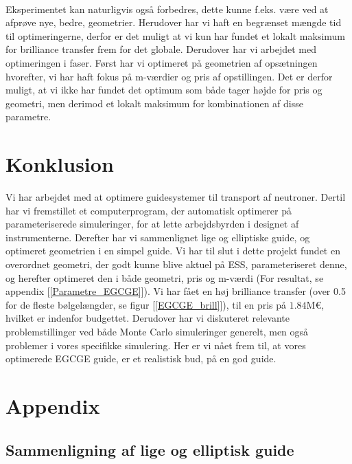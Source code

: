 \documentclass[12pt,oneside,a4paper]{article}
\begin{document}
{{{{{\\
Eksperimentet kan naturligvis også forbedres, dette kunne f.eks. være ved at afprøve nye, bedre, geometrier. Herudover har vi haft en begrænset mængde tid til optimeringerne, derfor er det muligt at vi kun har fundet et lokalt maksimum for brilliance transfer frem for det globale. Derudover har vi arbejdet med optimeringen i faser. Først har vi optimeret på geometrien af opsætningen hvorefter, vi har haft fokus på m-værdier og pris af opstillingen. Det er derfor muligt, at vi ikke har fundet det optimum som både tager højde for pris og geometri, men derimod et lokalt maksimum for kombinationen af disse parametre.

\section{Konklusion}
Vi har arbejdet med at optimere guidesystemer til transport af neutroner. Dertil har vi fremstillet et computerprogram, der automatisk optimerer på parameteriserede simuleringer, for at lette arbejdsbyrden i designet af instrumenterne. Derefter har vi sammenlignet lige og elliptiske guide, og optimeret geometrien i en simpel guide. Vi har til slut i dette projekt fundet en overordnet geometri, der godt kunne blive aktuel på ESS, parameteriseret denne, og herefter optimeret den i både geometri, pris og m-værdi (For resultat, se appendix [\ref{Parametre_EGCGE}]). Vi har fået en høj brilliance transfer (over 0.5 for de fleste bølgelængder, se figur [\ref{EGCGE_brill}]), til en pris på $1.84\text{M€}$, hvilket er indenfor budgettet. Derudover har vi diskuteret relevante problemstillinger ved både Monte Carlo simuleringer generelt, men også problemer i vores specifikke simulering. Her er vi nået frem til, at vores optimerede EGCGE guide, er et realistisk bud, på en god guide.


\newpage

 

\newpage

\appendix
\section{Appendix}

\subsection{Sammenligning af lige og elliptisk guide} \label{sammenligning}

}}}}}
\end{document}
